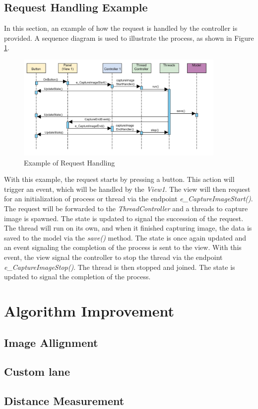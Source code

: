 \subsection{Request Handling Example}
\label{subsec:request_handling_example}

In this section, an example of how the request is handled by the controller is provided. A sequence diagram is used to illustrate the process, as shown in Figure \ref{fig:sequence_diagram}.

\begin{figure}[!ht]
    \centering
    \includegraphics[width=0.9\textwidth]{texs/Part2/chapter4/image/sequence.jpg}
    \caption{Example of Request Handling}
    \label{fig:sequence_diagram}
\end{figure}

With this example, the request starts by pressing a button. This action will trigger an event, which will be handled by the \textit{View1}. The view will then request for an initialization of process or thread via the endpoint \textit{e\_CaptureImageStart()}. The request will be forwarded to the \textit{ThreadController} and a threads to capture image is spawned. The state is updated to signal the succession of the request. The thread will run on its own, and when it finished capturing image, the data is saved to the model via the \textit{save()} method. The state is once again updated and an event signaling the completion of the process is sent to the view. With this event, the view signal the controller to stop the thread via the endpoint \textit{e\_CaptureImageStop()}. The thread is then stopped and joined. The state is updated to signal the completion of the process.

\section{Algorithm Improvement}
\label{sec:algorithm_improvement}

\subsection{Image Allignment}

\subsection{Custom lane}

\subsection{Distance Measurement}
















